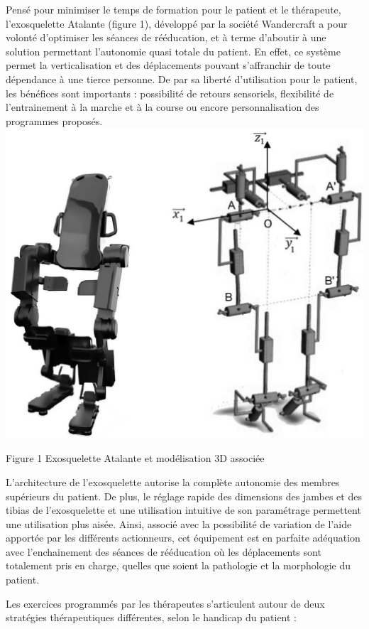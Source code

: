 \documentclass[10pt]{article}
\begin{document}
Pensé pour minimiser le temps de formation pour le patient et le thérapeute, l'exosquelette Atalante (figure 1), développé par la société Wandercraft a pour volonté d'optimiser les séances de rééducation, et à terme d'aboutir à une solution permettant l'autonomie quasi totale du patient. En effet, ce système permet la verticalisation et des déplacements pouvant s'affranchir de toute dépendance à une tierce personne. De par sa liberté d'utilisation pour le patient, les bénéfices sont importants : possibilité de retours sensoriels, flexibilité de l'entrainement à la marche et à la course ou encore personnalisation des programmes proposés.
\includegraphics[max width=\textwidth, center]{2023_05_12_54c6a64d2ffce28d5c72g-01(1)}

Figure 1 Exosquelette Atalante et modélisation 3D associée

L'architecture de l'exosquelette autorise la complète autonomie des membres supérieurs du patient. De plus, le réglage rapide des dimensions des jambes et des tibias de l'exosquelette et une utilisation intuitive de son paramétrage permettent une utilisation plus aisée. Ainsi, associé avec la possibilité de variation de l'aide apportée par les différents actionneurs, cet équipement est en parfaite adéquation avec l'enchainement des séances de rééducation où les déplacements sont totalement pris en charge, quelles que soient la pathologie et la morphologie du patient.

Les exercices programmés par les thérapeutes s'articulent autour de deux stratégies thérapeutiques différentes, selon le handicap du patient :
\end{document}
